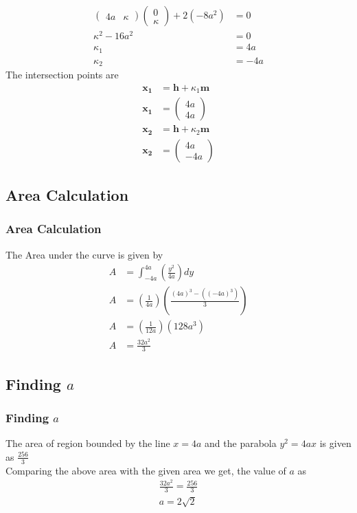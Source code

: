 \documentclass{beamer}
\providecommand{\brak}[1]{\ensuremath{\left(#1\right)}}
\theoremstyle{remark}
\newcommand{\myvec}[1]{\ensuremath{\begin{pmatrix}#1\end{pmatrix}}}
\let\vec\mathbf
\numberwithin{equation}{section}
\begin{document}
\begin{frame}
    \begin{align}
        \myvec{4a&\kappa}\myvec{0\\\kappa}+2\brak{-8a^2} &= 0\\
        \kappa^2-16a^2&= 0\\
        \kappa_1&=4a\\
        \kappa_2&=-4a
    \end{align}
    The intersection points are
    \begin{align}
        \vec{x_1} &= \vec{h}+\kappa_1\vec{m}\\
\vec{x_1} &= \myvec{4a\\4a}\\
\vec{x_2} &= \vec{h}+\kappa_2\vec{m}\\
\vec{x_2} &= \myvec{4a\\-4a}
    \end{align}

\end{frame}
\subsection{Area Calculation}
\begin{frame}
\frametitle{Area Calculation}
The Area under the curve is given by
\begin{align}
A &= \int_{-4a}^{4a}\brak{\frac{y^2}{4a}}dy\\
A &= \brak{\frac{1}{4a}}\brak{\frac{(4a)^3 - \brak{(-4a)^3}}{3}}\\
A &= \brak{\frac{1}{12a}}\brak{128a^3}\\
A &= \frac{32a^2}{3}
\end{align}
\end{frame}
\subsection{Finding $a$}
\begin{frame}
\frametitle{Finding $a$}
The area of region bounded by the line $x=4a$ and the parabola $y^2=4ax$ is given as $\frac{256}{3}$ \\ 
Comparing the above area with the given area we get, the value of $a$ as  
\begin{align}
    \frac{32a^2}{3} = \frac{256}{3} \\ 
    a = 2\sqrt{2}
    \end{align}

\end{frame}
\end{document}
